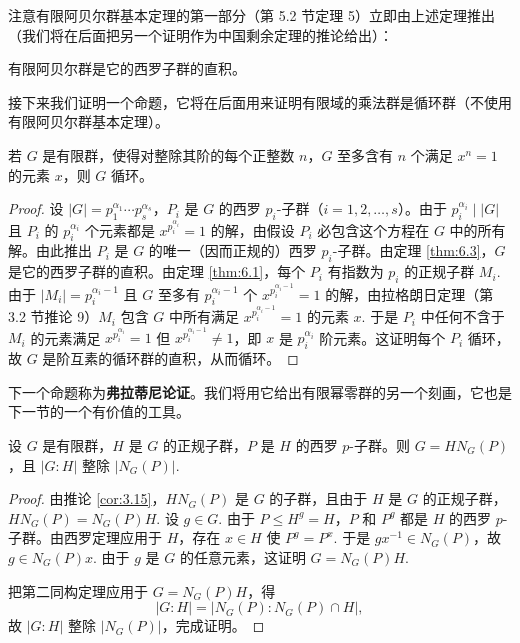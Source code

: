 注意有限阿贝尔群基本定理的第一部分（第 5.2 节定理 5）立即由上述定理推出（我们将在后面把另一个证明作为中国剩余定理的推论给出）：

\begin{corollary}\label{cor:6.4}
有限阿贝尔群是它的西罗子群的直积。
\end{corollary}

接下来我们证明一个命题，它将在后面用来证明有限域的乘法群是循环群（不使用有限阿贝尔群基本定理）。

\begin{proposition}\label{pro:6.5}
若 \(G\) 是有限群，使得对整除其阶的每个正整数 \(n\)，\(G\) 至多含有 \(n\) 个满足 \(x^n = 1\) 的元素 \(x\)，则 \(G\) 循环。
\end{proposition}

\begin{proof}
设 \(|G| = p_1^{\alpha_1} \cdots p_s^{\alpha_s}\)，\(P_i\) 是 \(G\) 的西罗 \(p_i\)-子群（\(i = 1, 2, \ldots, s\)）。由于 \(p_i^{\alpha_i} \mid |G|\) 且 \(P_i\) 的 \(p_i^{\alpha_i}\) 个元素都是 \(x^{p_i^{\alpha_i}} = 1\) 的解，由假设 \(P_i\) 必包含这个方程在 \(G\) 中的所有解。由此推出 \(P_i\) 是 \(G\) 的唯一（因而正规的）西罗 \(p_i\)-子群。由定理 \ref{thm:6.3}，\(G\) 是它的西罗子群的直积。由定理 \ref{thm:6.1}，每个 \(P_i\) 有指数为 \(p_i\) 的正规子群 \(M_i\). 由于 \(|M_i| = p_i^{\alpha_i-1}\) 且 \(G\) 至多有 \(p_i^{\alpha_i-1}\) 个 \(x^{p_i^{\alpha_i-1}} = 1\) 的解，由拉格朗日定理（第 3.2 节推论 9）\(M_i\) 包含 \(G\) 中所有满足 \(x^{p_i^{\alpha_i-1}} = 1\) 的元素 \(x\). 于是 \(P_i\) 中任何不含于 \(M_i\) 的元素满足 \(x^{p_i^{\alpha_i}} = 1\) 但 \(x^{p_i^{\alpha_i-1}} \neq 1\)，即 \(x\) 是 \(p_i^{\alpha_i}\) 阶元素。这证明每个 \(P_i\) 循环，故 \(G\) 是阶互素的循环群的直积，从而循环。
\end{proof}

下一个命题称为\textbf{弗拉蒂尼论证}。我们将用它给出有限幂零群的另一个刻画，它也是下一节的一个有价值的工具。

\begin{proposition}[弗拉蒂尼论证]\label{pro:6.6}
设 \(G\) 是有限群，\(H\) 是 \(G\) 的正规子群，\(P\) 是 \(H\) 的西罗 \(p\)-子群。则 \(G = HN_G(P)\)，且 \(|G : H|\) 整除 \(|N_G(P)|\).
\end{proposition}

\begin{proof}
由推论 \ref{cor:3.15}，\(HN_G(P)\) 是 \(G\) 的子群，且由于 \(H\) 是 \(G\) 的正规子群，\(HN_G(P) = N_G(P)H\). 设 \(g \in G\). 由于 \(P \leq H^g = H\)，\(P\) 和 \(P^g\) 都是 \(H\) 的西罗 \(p\)-子群。由西罗定理应用于 \(H\)，存在 \(x \in H\) 使 \(P^g = P^x\). 于是 \(gx^{-1} \in N_G(P)\)，故 \(g \in N_G(P)x\). 由于 \(g\) 是 \(G\) 的任意元素，这证明 \(G = N_G(P)H\).

把第二同构定理应用于 \(G = N_G(P)H\)，得
\[
|G : H| = |N_G(P) : N_G(P) \cap H|,
\]
故 \(|G : H|\) 整除 \(|N_G(P)|\)，完成证明。
\end{proof}

